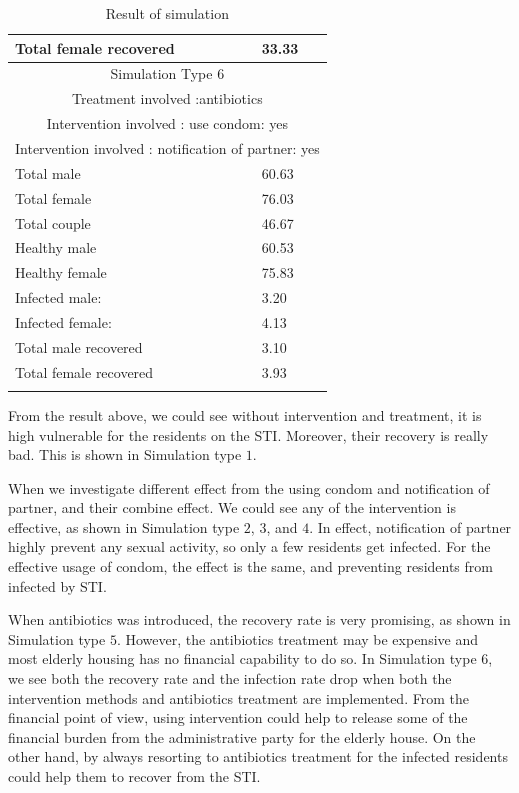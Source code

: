 \documentclass{article}
\begin{document}
\begin{normalsize}
\begin{longtable}{|p{7cm}|p{7cm}|}
		Total female recovered & 33.33\\		
		\hline
		\multicolumn{2}{|c|}{Simulation Type $6$} \\
		\multicolumn{2}{|c|}{Treatment involved :antibiotics} \\
		\multicolumn{2}{|c|}{Intervention involved : use condom: yes} \\
		\multicolumn{2}{|c|}{Intervention involved : notification of partner: yes} \\
		\hline
		Total male & 60.63\\
		Total female & 76.03\\
		Total couple & 46.67\\
		Healthy male & 60.53\\
		Healthy female & 75.83\\
		Infected male: & 3.20\\
		Infected female: & 4.13\\
		Total male recovered & 3.10\\
		Total female recovered & 3.93\\
		\hline
	\caption{Result of simulation}
	\label{tab:result}
\end{longtable}

From the result above, we could see without intervention and treatment, it is high vulnerable for the residents on the STI. Moreover, their recovery is really bad. This is shown in Simulation type $1$. 

When we investigate different effect from the using condom and notification of partner, and their combine effect. We could see any of the intervention is effective, as shown in Simulation type $2$, $3$, and $4$. In effect, notification of partner highly prevent any sexual activity, so only a few residents get infected. For the effective usage of condom, the effect is the same, and preventing residents from infected by STI.

When antibiotics was introduced, the recovery rate is very promising, as shown in Simulation type $5$. However, the antibiotics treatment may be expensive and most elderly housing has no financial capability to do so. In Simulation type $6$, we see both the recovery rate and the infection rate drop when both the intervention methods and antibiotics treatment are implemented. From the financial point of view, using intervention could help to release some of the financial burden from the administrative party for the elderly house. On the other hand, by always resorting to antibiotics treatment for the infected residents could help them to recover from the STI.


\end{normalsize}
\end{document}
